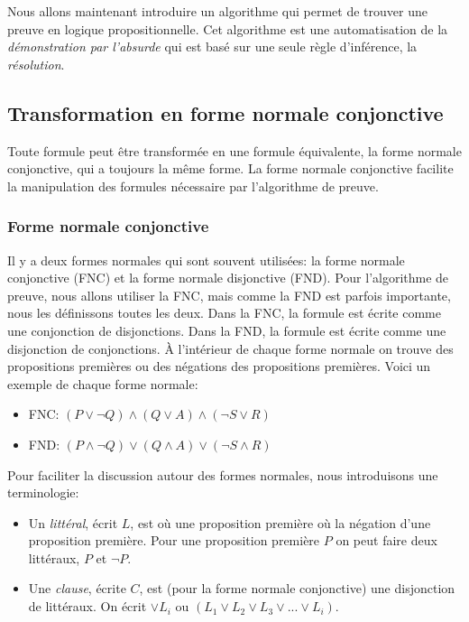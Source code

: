 Nous allons maintenant introduire un algorithme qui permet de trouver
une preuve en logique propositionnelle.
Cet algorithme est une automatisation de la {\em démonstration par l'absurde}
qui est basé sur une seule règle d'inférence, la {\em résolution}.

\subsection{Transformation en forme normale conjonctive}

Toute formule peut être transformée en une formule équivalente, la forme normale conjonctive,
qui a toujours la même forme.
La forme normale conjonctive facilite la manipulation des formules nécessaire
par l'algorithme de preuve.

\subsubsection{Forme normale conjonctive}

Il y a deux formes normales qui sont souvent utilisées:
la forme normale conjonctive (FNC) et la forme normale disjonctive (FND).
Pour l'algorithme de preuve, nous allons utiliser la FNC, mais comme la FND est parfois importante,
nous les définissons toutes les deux.
Dans la FNC, la formule est écrite comme une conjonction de disjonctions.
Dans la FND, la formule est écrite comme une disjonction de conjonctions.
À l'intérieur de chaque forme normale on trouve des propositions premières ou des négations des propositions premières.
Voici un exemple de chaque forme normale:
\begin{itemize}
  \item FNC: $( P \lor \lnot Q ) \land ( Q \lor A ) \land ( \lnot S \lor R )$  
  \item FND: $( P \land \lnot Q ) \lor ( Q \land A ) \lor ( \lnot S \land R )$  
\end{itemize}
Pour faciliter la discussion autour des formes normales, nous introduisons une terminologie:
\begin{itemize}
\item Un {\em littéral}, écrit $L$, est où une proposition première où la négation d'une proposition première.
Pour une proposition première $P$ on peut faire deux littéraux,
$P$ et $\lnot P$.
\item Une {\em clause}, écrite $C$, est (pour la forme normale conjonctive) une disjonction de littéraux.
On écrit $\lor L_i$ ou $( L_1 \lor L_2 \lor L_3 \lor ... \lor L_i )$.
\end{itemize}


